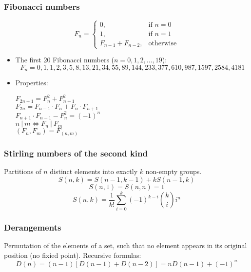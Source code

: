 \subsubsection{Fibonacci numbers}
\[ F_{n} =
  \begin{cases}
    0, & \text{if } n = 0 \\
    1, & \text{if } n = 1 \\
    F_{n - 1} + F_{n - 2}, & \text{otherwise}
  \end{cases}
\]
\begin{itemize}
  \item The first 20 Fibonacci numbers ($n = 0, 1, 2, \ldots, 19$):
  \[ F_n = 0, 1, 1, 2, 3, 5, 8, 13, 21, 34, 55, 89, 144, 233, 377, 610, 987, 1597, 2584, 4181 \]
  \item Properties:
  \begin{multicols*}{2}
    $F_{2n + 1} = F_{n}^2 + F_{n + 1}^2$ \\
    $F_{2n} = F_{n - 1} \cdot F_{n} + F_{n} \cdot F_{n + 1}$ \\
    $F_{n + 1} \cdot F_{n - 1} - F_{n}^2 = (-1)^{n}$ \\
    $n\ |\ m \iff F_{n}\ |\ F_{m}$ \\
    $(F_{n}, F_{m}) = F_{(n, m)}$
  \end{multicols*}
\end{itemize}

\subsubsection{Stirling numbers of the second kind}
Partitions of $n$ distinct elements into exactly $k$ non-empty groups.
\[ S(n, k) = S(n - 1, k - 1) + kS(n - 1, k)\]
\[ S(n, 1) = S(n, n) = 1 \]
\[ S(n, k) = \frac{1}{k!} \sum\limits_{i = 0}^{k} (-1)^{k - i} {k \choose i} i^n\]

\subsubsection{Derangements}
Permutation of the elements of a set, such that no element appears in its original position (no fixied point). Recursive formulas:
\[D(n) = (n - 1)[D(n - 1) + D(n - 2)] = nD(n - 1) + (-1)^n\]
